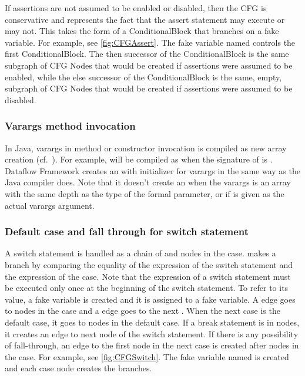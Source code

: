 If assertions are not assumed to be enabled or disabled, then
the CFG is conservative and represents the fact that the
assert statement may execute or may not.  This takes the form of a
ConditionalBlock that branches on a fake variable.  For example, see
\autoref{fig:CFGAssert}.  The fake variable named
 controls the first ConditionalBlock.
The then successor of the ConditionalBlock is the same subgraph of CFG
Nodes that would be created if assertions were assumed to be enabled,
while the else successor of the ConditionalBlock is the same, empty,
subgraph of CFG Nodes that would be created if assertions were assumed
to be disabled.



\subsubsection{Varargs method invocation}
\label{sec:varargs}

In Java, varargs in method or constructor invocation is compiled
as new array creation (cf.\ ). For example,
 will be compiled as 
when the signature of  is . Dataflow
Framework creates an  with initializer for varargs
in the same way as the Java compiler does.
Note that it doesn't create an 
when the varargs is an array with the same depth as the type of
the formal parameter, or if  is given as the actual varargs argument.

\subsubsection{Default case and fall through for switch statement}
\label{sec:default-switch}

A switch statement is handled as a chain of  and nodes in
the case.  makes a branch by comparing the equality of
the expression of the switch statement and the expression of the case.
Note that the expression of a switch statement must be executed only
once at the beginning of the switch statement. To refer to its value, a fake variable
is created and it is assigned to a fake variable. A 
edge goes to nodes in the case and a  edge goes to the next
. When the next case is the default case, it goes to nodes in the default
case. If a break statement is in nodes, it creates an edge to next node of
the switch statement. If there is any possibility of fall-through, an edge
to the first node in the next case is created after nodes in the case.
For example, see \autoref{fig:CFGSwitch}. The fake variable named 
is created and each case node creates the branches.

